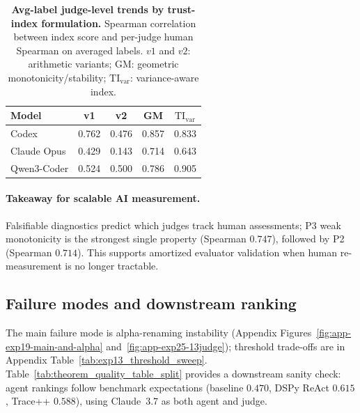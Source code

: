 \documentclass{article}
\begin{document}
\begin{table}[t]
  \centering
  \small
  \begin{tabular}{lcccc}
    \toprule
    \textbf{Model} & \textbf{v1} & \textbf{v2} & \textbf{GM} & $\mathrm{TI}_{\mathrm{var}}$ \\
    \midrule
    Codex          & 0.762       & 0.476       & 0.857       & 0.833                        \\
    Claude Opus    & 0.429       & 0.143       & 0.714       & 0.643                        \\
    Qwen3-Coder    & 0.524       & 0.500       & 0.786       & 0.905                        \\
    \bottomrule
  \end{tabular}
  \caption{\textbf{Avg-label judge-level trends by trust-index formulation.}
  Spearman correlation between index score and per-judge human Spearman on averaged labels.
  \(v1\) and \(v2\): arithmetic variants; GM: geometric monotonicity/stability; \(\mathrm{TI}_{\mathrm{var}}\): variance-aware index.}
  \label{tab:cross_model_index_compare_avg}
\end{table}

\paragraph{Takeaway for scalable AI measurement.}
Falsifiable diagnostics predict which judges track human assessments; P3 weak monotonicity is the strongest single property (Spearman \(0.747\)), followed by P2 (Spearman \(0.714\)). This supports amortized evaluator validation when human re-measurement is no longer tractable.

\subsection{Failure modes and downstream ranking}
The main failure mode is alpha-renaming instability (Appendix Figures~\ref{fig:app-exp19-main-and-alpha} and~\ref{fig:app-exp25-13judge}); threshold trade-offs are in Appendix Table~\ref{tab:exp13_threshold_sweep}.
Table~\ref{tab:theorem_quality_table_split} provides a downstream sanity check: agent rankings follow benchmark expectations (baseline \(0.470\), DSPy ReAct \(0.615\), Trace++ \(0.588\)), using Claude~3.7 as both agent and judge.
\end{document}
